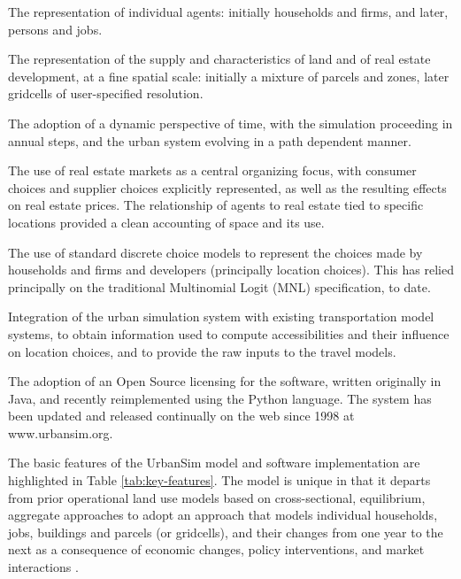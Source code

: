 \squishlist
\item The representation of individual agents: initially households and firms, and later, persons and jobs.
\item The representation of the supply and characteristics of land and of real estate development, at a fine spatial scale: initially a mixture of parcels and zones, later gridcells of user-specified resolution.
\item   The adoption of a dynamic perspective of time, with the simulation proceeding in annual steps, and the urban system evolving in a path dependent manner.
\item   The use of real estate markets as a central organizing focus, with consumer choices and supplier choices explicitly represented, as well as the resulting effects on real estate prices.  The relationship of agents to real estate tied to specific locations provided a clean accounting of space and its use.
\item   The use of standard discrete choice models to represent the choices made by households and firms and developers (principally location choices).  This has relied principally on the traditional Multinomial Logit (MNL) specification, to date.
\item   Integration of the urban simulation system with existing transportation model systems, to obtain information used to compute accessibilities and their influence on location choices, and to provide the raw inputs to the travel models.
\item   The adoption of an Open Source licensing for the software, written originally in Java, and recently reimplemented using the Python language.  The system has been updated and released continually on the web since 1998 at www.urbansim.org.
\squishend

The basic features of the UrbanSim model and software implementation are highlighted in Table \ref{tab:key-features}.  The model is unique in that it departs from prior operational land use models based on cross-sectional, equilibrium, aggregate approaches to adopt an approach that models individual households, jobs, buildings and parcels (or gridcells), and their changes from one year to the next as a consequence of economic changes, policy interventions, and market interactions .

